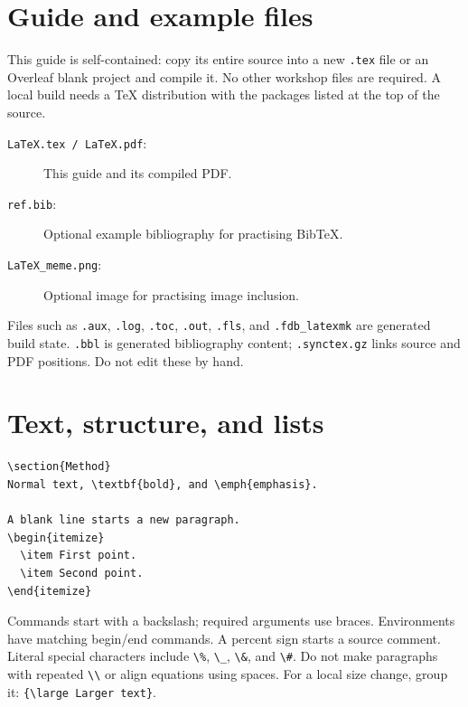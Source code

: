 \documentclass[11pt]{article}
\begin{document}
\section{Guide and example files}
This guide is self-contained: copy its entire source into a new \texttt{.tex}
file or an Overleaf blank project and compile it. No other workshop files
are required. A local build needs a TeX distribution with the packages listed
at the top of the source.
\begin{description}
\item[\texttt{LaTeX.tex / LaTeX.pdf}:] This guide and its compiled PDF.
\item[\texttt{ref.bib}:] Optional example bibliography for practising BibTeX.
\item[\texttt{LaTeX\_meme.png}:] Optional image for practising image inclusion.
\end{description}
Files such as \texttt{.aux}, \texttt{.log}, \texttt{.toc}, \texttt{.out},
\texttt{.fls}, and \texttt{.fdb\_latexmk} are generated build state.
\texttt{.bbl} is generated bibliography content; \texttt{.synctex.gz} links
source and PDF positions. Do not edit these by hand.

\section{Text, structure, and lists}
\begin{lstlisting}
\section{Method}
Normal text, \textbf{bold}, and \emph{emphasis}.

A blank line starts a new paragraph.
\begin{itemize}
  \item First point.
  \item Second point.
\end{itemize}
\end{lstlisting}
Commands start with a backslash; required arguments use braces.
Environments have matching begin/end commands.
A percent sign starts a source comment. Literal special characters include
\verb|\%|, \verb|\_|, \verb|\&|, and \verb|\#|.
Do not make paragraphs with repeated \verb|\\| or align equations using spaces.
For a local size change, group it: \verb|{\large Larger text}|.
\end{document}
